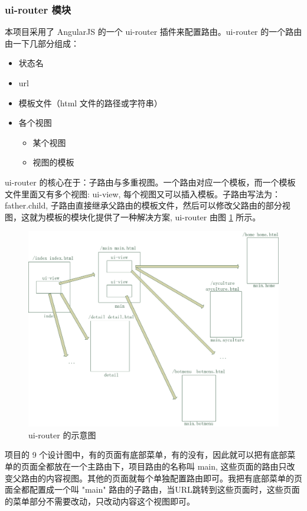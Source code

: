             \subsubsection{ui-router 模块}
              \label{subsubsec:ui_router_模块}
                本项目采用了 AngularJS 的一个 ui-router 插件来配置路由。ui-router 的一个路由由一下几部分组成：
                \begin{itemize}
                  \item 状态名
                  \item url
                  \item 模板文件（html 文件的路径或字符串）
                  \item 各个视图
                  \begin{itemize}
                    \item 某个视图
                    \item 视图的模板
                  \end{itemize}
                \end{itemize}
                \par
                ui-router 的核心在于：子路由与多重视图。一个路由对应一个模板，而一个模板文件里面又有多个视图: ui-view, 每个视图又可以插入模板。子路由写法为：father.child, 子路由直接继承父路由的模板文件，然后可以修改父路由的部分视图，这就为模板的模块化提供了一种解决方案, ui-router 由图 \ref{fig:ui_view} 所示。
                \begin{figure}[H]
                  \centering
                  \includegraphics[width=\textwidth]{./img/ui_view.png}
                  \caption{ui-router 的示意图}
                  \label{fig:ui_view}
                \end{figure}
                项目的 9 个设计图中，有的页面有底部菜单，有的没有，因此就可以把有底部菜单的页面全都放在一个主路由下，项目路由的名称叫 main, 这些页面的路由只改变父路由的内容视图。其他的页面就每个单独配置路由即可。我把有底部菜单的页面全都配置成一个叫 "main" 路由的子路由，当URL跳转到这些页面时，这些页面的菜单部分不需要改动，只改动内容这个视图即可。

